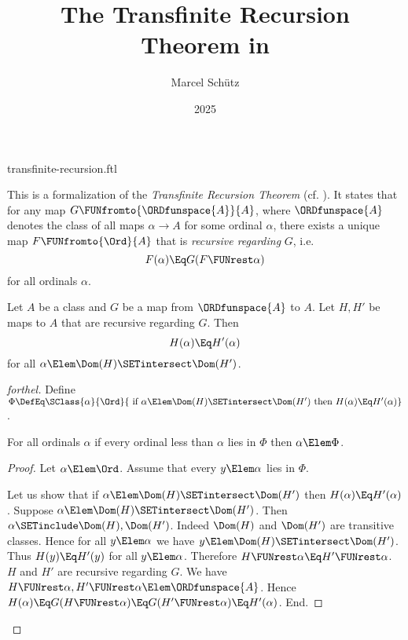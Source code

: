 \documentclass{stex}
\title{The Transfinite Recursion Theorem in \Naproche}
\author{Marcel Schütz}
\date{2025}
\begin{document}
\begin{smodule}{transfinite-recursion.ftl}
\maketitle



\noindent This is a formalization of the \emph{Transfinite Recursion Theorem}
(cf. \cite{Koepke2018}).
It states that for any map $G \FUNfromto{\ORDfunspace{A}}{A}$, where
$\ORDfunspace{A}$ denotes the class of all maps $\alpha \to A$ for some
ordinal $\alpha$, there exists a unique map $F \FUNfromto{\Ord}{A}$ that is
\emph{recursive regarding} $G$, i.e. \[F(\alpha) \Eq G(F \FUNrest \alpha)\] for
all ordinals $\alpha$.

\begin{lemma}[forthel,title=Coincidence Lemma,name=coincidence lemma]
  Let $A$ be a class and $G$ be a map from $\ORDfunspace{A}$ to $A$.
  Let $H, H'$ be maps to $A$ that are recursive regarding $G$.
  Then \[ H(\alpha) \Eq H'(\alpha) \] for all $\alpha \Elem \Dom(H) \SETintersect \Dom(H')$.
\end{lemma}
\begin{proof}[forthel]
  Define $\Phi \DefEq \SClass{\alpha}{\Ord}{\text{ if }
  \alpha \Elem \Dom(H) \SETintersect \Dom(H')\text{ then }H(\alpha) \Eq H'(\alpha)}$.

  For all ordinals $\alpha$ if every ordinal less than $\alpha$ lies in $\Phi$ then $\alpha \Elem \Phi$.
  \begin{proof}
    Let $\alpha \Elem \Ord$.
    Assume that every $y \Elem \alpha$ lies in $\Phi$.

    Let us show that if $\alpha \Elem \Dom(H) \SETintersect \Dom(H')$ then
    $H(\alpha) \Eq H'(\alpha)$.
      Suppose $\alpha \Elem \Dom(H) \SETintersect \Dom(H')$.
      Then $\alpha \SETinclude \Dom(H), \Dom(H')$.
      Indeed $\Dom(H)$ and $\Dom(H')$ are transitive classes.
      Hence for all $y \Elem \alpha$ we have $y \Elem\linebreak \Dom(H) \SETintersect \Dom(H')$.
      Thus $H(y) \Eq H'(y)$ for all $y \Elem \alpha$.
      Therefore $H \FUNrest \alpha \Eq\linebreak H' \FUNrest \alpha$.
      $H$ and $H'$ are recursive regarding $G$.
      We have $H \FUNrest \alpha, H' \FUNrest \alpha \Elem \ORDfunspace{A}$.
      Hence $H(\alpha)
        \Eq G(H \FUNrest \alpha)
        \Eq G(H' \FUNrest \alpha)
        \Eq H'(\alpha)$.
    End.


\end{proof}
\end{proof}
\end{smodule}
\end{document}
